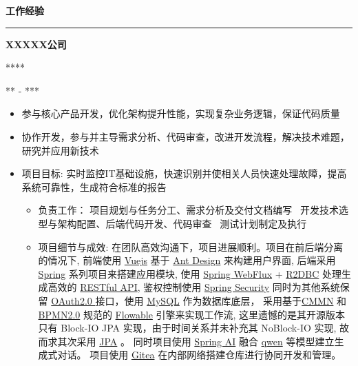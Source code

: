 \documentclass[11pt,a4paper]{article}
\renewcommand{\section}[1]{%
    \vspace{0.6em}%
    {\sffamily\Large\bfseries\color{sectioncolor}#1}%
    \vspace{0.2em}%
    \hrule height 0.5pt
    \vspace{0.4em}%
}
\newcommand{\company}[1]{%
    {\vspace{0.2em}\sffamily\textbf{\large#1}}%
}
\newcommand{\position}[2]{%
    \vspace{0.1em}  %
    \role{#1}\hfill\role{#2}%
    \vspace{0.2em}  %
}
\newcommand{\role}[1]{{\sffamily\color{graytext}\small#1}}
\newcommand{\daterange}[1]{\hfill{\sffamily\color{graytext}\small#1}}
\newcommand{\project}[1]{{\sffamily\textbf{\cjkit { \textit {\itshape#1}}}}}
\newcommand{\separator}{\textbullet~}  %
\begin{document}
\section{工作经验}
\company{XXXXX公司} 
\position{***}{***}
\daterange{*** - ***}
\begin{itemize}
    \item 参与核心产品开发，优化架构提升性能，实现复杂业务逻辑，保证代码质量
    \item 协作开发，参与并主导需求分析、代码审查，改进开发流程，解决技术难题，研究并应用新技术
\end{itemize}

\project{XXX系统}
\begin{itemize}
    \item 项目目标: 实时监控IT基础设施，快速识别并使相关人员快速处理故障，提高系统可靠性，生成符合标准的报告
        \begin{itemize}
            \item 负责工作： 项目规划与任务分工、需求分析及交付文档编写 \separator 开发技术选型与架构配置、后端代码开发、代码审查 \separator 测试计划制定及执行
            \item 项目细节与成效: 在团队高效沟通下，项目进展顺利。项目在前后端分离的情况下, 前端使用 \href{https://cn.vuejs.org/}{Vuejs} 基于 \href{https://ant.design/index-cn}{Ant Design} 来构建用户界面,
            后端采用 \href{https://spring.io/}{Spring} 系列项目来搭建应用模块, 使用 \href{https://docs.spring.io/spring-framework/reference/web-reactive.html}{Spring WebFlux} + \href{https://spring.io/projects/spring-data-r2dbc}{R2DBC} 处理生成高效的 \href{https://www.ibm.com/cn-zh/topics/rest-apis}{RESTful API}, 
            鉴权控制使用 \href{https://spring.io/projects/spring-security}{Spring Security} 同时为其他系统保留 \href{https://oauth.ac.cn/2/}{OAuth2.0 } 接口，使用 \href{https://www.mysql.com/cn/}{MySQL} 作为数据库底层，
            采用基于\href{https://www.omg.org/spec/CMMN}{CMMN} 和 \href{https://www.omg.org/spec/BPMN/2.0}{BPMN2.0} 规范的 \href{https://www.flowable.com/open-source/docs/}{Flowable} 引擎来实现工作流, 这里遗憾的是其开源版本只有 Block-IO JPA 实现，由于时间关系并未补充其 NoBlock-IO 实现, 故而求其次采用 \href{https://spring.io/projects/spring-data-jpa}{JPA} 。
            同时项目使用 \href{https://spring.io/projects/spring-ai}{Spring AI} 融合 \href{https://qwen.readthedocs.io/zh-cn/latest/index.html}{qwen} 等模型建立生成式对话。
            项目使用 \href{https://about.gitea.com/}{Gitea} 在内部网络搭建仓库进行协同开发和管理。
        \end{itemize}
    
\end{itemize}
\end{document}
